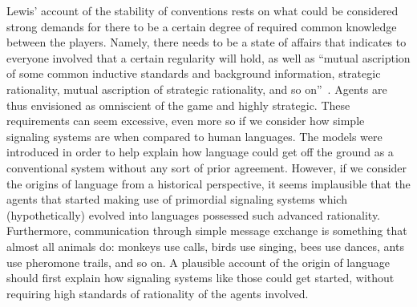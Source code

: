 \documentclass[a4paper]{article}
\begin{document}
Lewis' account of the stability of conventions rests on what could be considered strong demands for there to be a certain degree of required common knowledge between the players.
Namely, there needs to be a state of affairs that indicates to everyone involved that a certain regularity will hold, as well as ``mutual ascription of some common inductive standards and background information, strategic rationality, mutual ascription of strategic rationality, and so on''~\parencite*[56--57]{lewis_convention_1969}.
Agents are thus envisioned as omniscient of the game and highly strategic.
These requirements can seem excessive, even more so if we consider how simple signaling systems are when compared to human languages.
The models were introduced in order to help explain how language could get off the ground as a conventional system without any sort of prior agreement.
However, if we consider the origins of language from a historical perspective, it seems implausible that the agents that started making use of primordial signaling systems which (hypothetically) evolved into languages possessed such advanced rationality.
Furthermore, communication through simple message exchange is something that almost all animals do: monkeys use calls, birds use singing, bees use dances, ants use pheromone trails, and so on.
A plausible account of the origin of language should first explain how signaling systems like those could get started, without requiring high standards of rationality of the agents involved.
\end{document}
